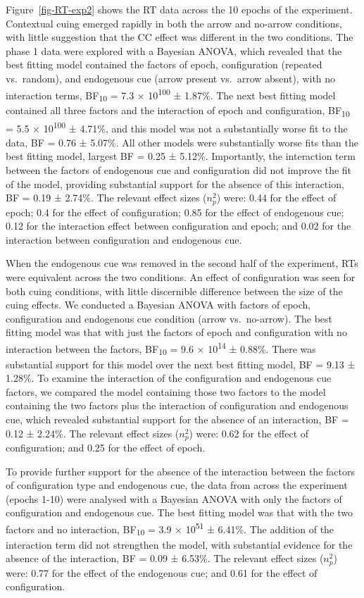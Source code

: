 \documentclass[
  man,
  floatsintext,
  longtable,
  nolmodern,
  notxfonts,
  notimes,
  colorlinks=true,linkcolor=blue,citecolor=blue,urlcolor=blue]{apa7}
\begin{document}
Figure~\ref{fig-RT-exp2} shows the RT data across the 10 epochs of the
experiment. Contextual cuing emerged rapidly in both the arrow and
no-arrow conditions, with little suggestion that the CC effect was
different in the two conditions. The phase 1 data were explored with a
Bayesian ANOVA, which revealed that the best fitting model contained the
factors of epoch, configuration (repeated vs.~random), and endogenous
cue (arrow present vs.~arrow absent), with no interaction terms,
BF\textsubscript{10} = 7.3 × 10\textsuperscript{100} ± 1.87\%. The next
best fitting model contained all three factors and the interaction of
epoch and configuration, BF\textsubscript{10} = 5.5 ×
10\textsuperscript{100} ± 4.71\%, and this model was not a substantially
worse fit to the data, BF = 0.76 ± 5.07\%. All other models were
substantially worse fits than the best fitting model, largest BF = 0.25
± 5.12\%. Importantly, the interaction term between the factors of
endogenous cue and configuration did not improve the fit of the model,
providing substantial support for the absence of this interaction, BF =
0.19 ± 2.74\%. The relevant effect sizes (\(n^2_p\)) were: 0.44 for the
effect of epoch; 0.4 for the effect of configuration; 0.85 for the
effect of endogenous cue; 0.12 for the interaction effect between
configuration and epoch; and 0.02 for the interaction between
configuration and endogenous cue.

When the endogenous cue was removed in the second half of the
experiment, RTs were equivalent across the two conditions. An effect of
configuration was seen for both cuing conditions, with little
discernible difference between the size of the cuing effects. We
conducted a Bayesian ANOVA with factors of epoch, configuration and
endogenous cue condition (arrow vs.~no-arrow). The best fitting model
was that with just the factors of epoch and configuration with no
interaction between the factors, BF\textsubscript{10} = 9.6 ×
10\textsuperscript{14} ± 0.88\%. There was substantial support for this
model over the next best fitting model, BF = 9.13 ± 1.28\%. To examine
the interaction of the configuration and endogenous cue factors, we
compared the model containing those two factors to the model containing
the two factors plus the interaction of configuration and endogenous
cue, which revealed substantial support for the absence of an
interaction, BF = 0.12 ± 2.24\%. The relevant effect sizes (\(n^2_p\))
were: 0.62 for the effect of configuration; and 0.25 for the effect of
epoch.

To provide further support for the absence of the interaction between
the factors of configuration type and endogenous cue, the data from
across the experiment (epochs 1-10) were analysed with a Bayesian ANOVA
with only the factors of configuration and endogenous cue. The best
fitting model was that with the two factors and no interaction,
BF\textsubscript{10} = 3.9 × 10\textsuperscript{51} ± 6.41\%. The
addition of the interaction term did not strengthen the model, with
substantial evidence for the absence of the interaction, BF = 0.09 ±
6.53\%. The relevant effect sizes (\(n^2_p\)) were: 0.77 for the effect
of the endogenous cue; and 0.61 for the effect of configuration.
\end{document}

